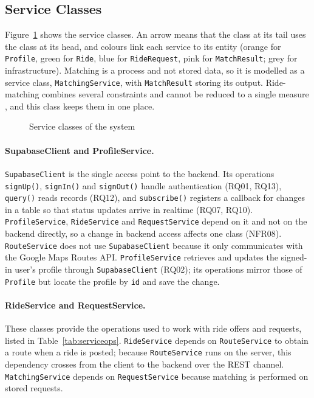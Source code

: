 \subsection{Service Classes}
\label{sec:serviceclasses}

Figure~\ref{fig:service} shows the service classes. An arrow means that the class at its tail uses the class at its head, and colours link each service to its entity (orange for \texttt{Profile}, green for \texttt{Ride}, blue for \texttt{RideRequest}, pink for \texttt{MatchResult}; grey for infrastructure). Matching is a process and not stored data, so it is modelled as a service class, \texttt{MatchingService}, with \texttt{MatchResult} storing its output. Ride-matching combines several constraints and cannot be reduced to a single measure \citep{agatz2012,stiglic2016}, and this class keeps them in one place.

\begin{figure}[htbp]
  \centering
  \caption{Service classes of the system}
  \label{fig:service}
\end{figure}

\paragraph{SupabaseClient and ProfileService.} \texttt{SupabaseClient} is the single access point to the backend. Its operations \texttt{signUp()}, \texttt{signIn()} and \texttt{signOut()} handle authentication (RQ01, RQ13), \texttt{query()} reads records (RQ12), and \texttt{subscribe()} registers a callback for changes in a table so that status updates arrive in realtime (RQ07, RQ10). \texttt{ProfileService}, \texttt{RideService} and \texttt{RequestService} depend on it and not on the backend directly, so a change in backend access affects one class (NFR08). \texttt{RouteService} does not use \texttt{SupabaseClient} because it only communicates with the Google Maps Routes API. \texttt{ProfileService} retrieves and updates the signed-in user's profile through \texttt{SupabaseClient} (RQ02); its operations mirror those of \texttt{Profile} but locate the profile by \texttt{id} and save the change.

\paragraph{RideService and RequestService.} These classes provide the operations used to work with ride offers and requests, listed in Table~\ref{tab:serviceops}. \texttt{RideService} depends on \texttt{RouteService} to obtain a route when a ride is posted; because \texttt{RouteService} runs on the server, this dependency crosses from the client to the backend over the REST channel. \texttt{MatchingService} depends on \texttt{RequestService} because matching is performed on stored requests.

